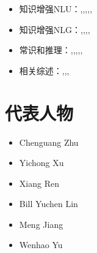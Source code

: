 \documentclass[11pt]{article}
\begin{document}
\begin{itemize}
    \item 知识增强NLU：\cite{zhang2019ernie},\cite{peters2019knowledge},\cite{liu2020k},\cite{ding2019cognitive},\cite{lv2020graph},\cite{yu2022jaket}
    \item 知识增强NLG：\cite{zhou2018commonsense},\cite{zhang2020grounded},\cite{ji2020language},\cite{lewis2020retrieval},\cite{wang2021retrieval}
    \item 常识和推理：\cite{ma2019towards},\cite{fan2020enhanced},\cite{liu2021kg},\cite{wang2021retrieval},\cite{guan2019story},\cite{guan2020knowledge}
    \item 相关综述：\cite{yu2020identifying},\cite{yang2021survey},\cite{zhang2022survey},\cite{wei2021knowledge}
\end{itemize}

\section{代表人物}

\begin{itemize}
    \item Chenguang Zhu
    \item Yichong Xu
    \item Xiang Ren
    \item Bill Yuchen Lin
    \item Meng Jiang
    \item Wenhao Yu
\end{itemize}



\end{document}

